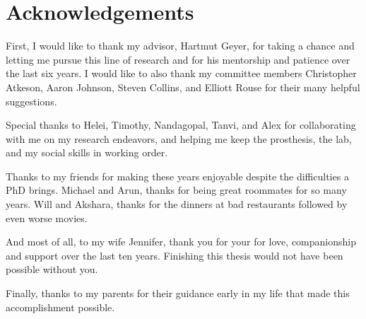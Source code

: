 \chapter*{Acknowledgements}

First, I would like to thank my advisor, Hartmut Geyer, for taking a chance and
letting me pursue this line of research and for his mentorship and patience over
the last six years. I would like to also thank my committee members Christopher
Atkeson, Aaron Johnson, Steven Collins, and Elliott Rouse for their many helpful
suggestions.

Special thanks to Helei, Timothy, Nandagopal, Tanvi, and Alex for collaborating
with me on my research endeavors, and helping me keep the prosthesis, the lab,
and my social skills in working order.

Thanks to my friends for making these years enjoyable despite the difficulties a
PhD brings. Michael and Arun, thanks for being great roommates for so many
years. Will and Akshara, thanks for the dinners at bad restaurants followed by
even worse movies.

And most of all, to my wife Jennifer, thank you for your for love, companionship
and support over the last ten years. Finishing this thesis would not have been
possible without you.

Finally, thanks to my parents for their guidance early in my life that made this
accomplishment possible.
